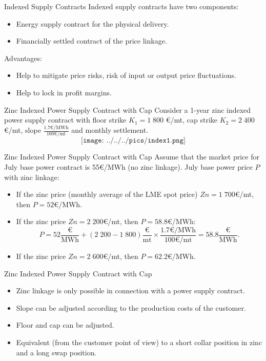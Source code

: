 {Indexed Supply Contracts}
Indexed supply contracts have two components:
\begin{itemize}
  \item Energy supply contract for the physical delivery.
  \item Financially settled contract of the price linkage.
\end{itemize}
\vspace{0.5cm}
Advantages:
\begin{itemize}
  \item Help to mitigate price risks, risk of input or output price fluctuations.
  \item Help to lock in profit margins.
\end{itemize}



{Zinc Indexed Power Supply Contract with Cap}
Consider a 1-year zinc indexed power supply contract with floor strike $K_1=1\;800$ €/mt, cap strike $K_2=2\;400$ €/mt, slope $\frac{1.7\text{€/MWh}}{100\text{€/mt}}$ and monthly settlement.
$$\texttt{[image: ../../../pics/index1.png]}$$



{Zinc Indexed Power Supply Contract with Cap}
Assume that the market price for July base power contract is \textcolor[rgb]{1.00,0.00,0.00}{55€/MWh} (no zinc linkage). July base power price $P$ with zinc linkage:\\
\vspace{0.2cm}
\begin{itemize}
  \item<2-> If the zinc price (monthly average of the LME spot price) $Zn=1\;700$€/mt, then \textcolor[rgb]{0.00,0.00,1.00}{$P=52$€/MWh}.
  \item<3-> If the zinc price $Zn=2\;200$€/mt, then \textcolor[rgb]{0.00,0.00,1.00}{$P=58.8$€/MWh}:
  $$P=52\frac{\text{€}}{\text{MWh}}+(2\;200-1\;800)\frac{\text{€}}{\text{mt}}\times\frac{1.7\text{€/MWh}}{100\text{€/mt}}=58.8\frac{\text{€}}{\text{MWh}}.$$
  \item<4-> If the zinc price $Zn=2\;600$€/mt, then \textcolor[rgb]{0.00,0.00,1.00}{$P=62.2$€/MWh}.
\end{itemize}



{Zinc Indexed Power Supply Contract with Cap}
\begin{itemize}
  \item<1-> Zinc linkage is only possible in connection with a power supply contract.
  \item<2-> Slope can be adjusted according to the production costs of the customer.
  \item<3-> Floor and cap can be adjusted.
  \item<4-> Equivalent (from the customer point of view) to a short collar position in zinc and a long swap position.
\end{itemize}




